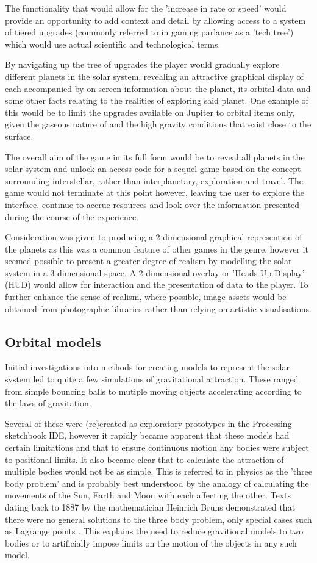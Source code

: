 \documentclass[twoside]{bhamthesis}
\begin{document}
The functionality that would allow for the 'increase in rate or speed' would provide an opportunity to add context and detail by allowing access to a system of tiered upgrades (commonly referred to in gaming parlance as a 'tech tree') which would use actual scientific and technological terms.

By navigating up the tree of upgrades the player would gradually explore different planets in the solar system, revealing an attractive graphical display of each accompanied by on-screen information about the planet, its orbital data and some other facts relating to the realities of exploring said planet. One example of this would be to limit the upgrades available on Jupiter to orbital items only, given the gaseous nature of and the high gravity conditions that exist close to the surface.

The overall aim of the game in its full form would be to reveal all planets in the solar system and unlock an access code for a sequel game based on the concept surrounding interstellar, rather than interplanetary, exploration and travel. The game would not terminate at this point however, leaving the user to explore the interface, continue to accrue resources and look over the information presented during the course of the experience.

Consideration was given to producing a 2-dimensional graphical represention of the planets as this was a common feature of other games in the genre, however it seemed possible to present a greater degree of realism by modelling the solar system in a 3-dimensional space. A 2-dimensional overlay or 'Heads Up Display' (HUD) would allow for interaction and the presentation of data to the player. To further enhance the sense of realism, where possible, image assets would be obtained from photographic libraries rather than relying on artistic visualisations.


\subsection{Orbital models}
Initial investigations into methods for creating models to represent the solar system led to quite a few simulations of gravitational attraction. These ranged from simple bouncing balls to mutiple moving objects accelerating according to the laws of gravitation.

Several of these were (re)created as exploratory prototypes in the Processing sketchbook IDE, however it rapidly became apparent that these models had certain limitations and that to ensure continuous motion any bodies were subject to positional limits. It also became clear that to calculate the attraction of multiple bodies would not be as simple. This is referred to in physics as the 'three body problem' and is probably best understood by the analogy of calculating the movements of the Sun, Earth and Moon with each affecting the other. Texts dating back to 1887  by the mathematician Heinrich Bruns demonstrated that there were no general solutions to the three body problem, only special cases such as Lagrange points \cite{oconnor_bruns_????}. This explains the need to reduce gravitional models to two bodies or to artificially impose limits on the motion of the objects in any such model.
\end{document}
